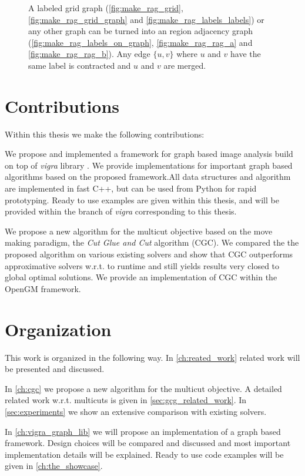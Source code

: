 \begin{figure}
{}
\caption{
    A labeled grid graph  (\cref{fig:make_rag_grid}, \cref{fig:make_rag_grid_graph}  and \ref{fig:make_rag_labels_labels})
    or any other graph can be turned into an region adjacency graph (\cref{fig:make_rag_labels_on_graph}, \cref{fig:make_rag_rag_a} and \cref{fig:make_rag_rag_b}). 
    Any edge  $\{u,v\}$ where $u$ and $v$ have the same label is contracted and $u$ and $v$ 
    are merged.
}\label{fig:make_rag}
\end{figure}


\section{Contributions}

Within this thesis we make the following contributions:

\begin{compactitem}
    \item We propose and implemented a framework for graph based image analysis 
        build on top of  \emph{vigra} library \cite{software_vigra}. We provide implementations for important graph based algorithms based on the proposed framework.All data structures and algorithm are implemented in fast C++, 
        but can be used from Python for rapid prototyping.
        Ready to use examples are given within this thesis, and will be 
        provided within the branch of \emph{vigra} corresponding to 
        this thesis.



    \item 
        We propose a new algorithm for the multicut objective based on the move
        making paradigm, the \emph{Cut Glue and Cut} algorithm (CGC). We compared the 
        the proposed algorithm on various existing solvers and show
        that CGC outperforms approximative solvers w.r.t. to runtime and still yields
        results very closed to global optimal solutions. We provide an implementation of CGC within the OpenGM framework.



\end{compactitem}


\section{Organization}

This work is organized in the following way.
In \cref{ch:reated_work} related work will be presented and  discussed.



In \cref{ch:cgc} we propose a new algorithm for the multicut objective.
A detailed related work w.r.t. multicuts is given in \cref{sec:gcg_related_work}.
In \cref{sec:experiments} we show an extensive comparison  with existing solvers.



In \cref{ch:vigra_graph_lib} we will propose an implementation of
a graph based framework. 
Design choices will be compared and discussed and most 
important implementation details will be explained.
Ready to use code examples will be given in \cref{ch:the_showcase}.




